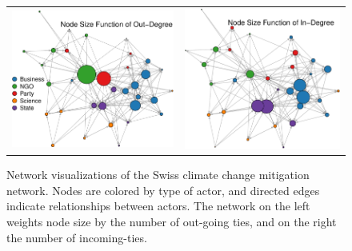\documentclass[12pt,pdflatex]{elsarticle}
\begin{document}
\begin{figure}[ht]
	\centering
	\begin{tabular}{cc}
	\includegraphics[width=.47\textwidth]{dvNet_outDegree} & 
	\includegraphics[width=.44\textwidth]{dvNet_inDegree}
	\end{tabular}
	\caption{Network visualizations of the Swiss climate change mitigation network. Nodes are colored by type of actor, and directed edges indicate relationships between actors. The network on the left weights node size by the number of out-going ties, and on the right the number of incoming-ties.}
	\label{fig:dvNet}
\end{figure}
\FloatBarrier
\end{document}
